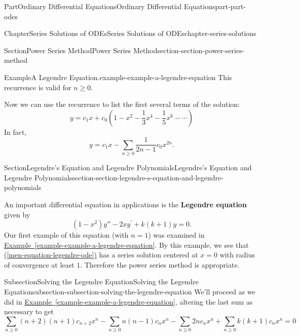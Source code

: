 \documentclass[twoside,10pt,]{book}
\newcommand{\xreffont}{\relax}
\newcommand{\terminology}[1]{\textbf{#1}}
\numberwithin{equation}{part}
\begin{document}
\begin{partptx}{Part}{Ordinary Differential Equations}{}{Ordinary Differential Equations}{}{}{part-part-odes}
\begin{chapterptx}{Chapter}{Series Solutions of ODEs}{}{Series Solutions of ODEs}{}{}{chapter-series-solutions}
\begin{sectionptx}{Section}{Power Series Method}{}{Power Series Method}{}{}{section-section-power-series-method}
\begin{example}{Example}{A Legendre Equation.}{example-example-a-legendre-equation}
This recurrence is valid for \(n\geq0\).%
\par
Now we can use the recurrence to list the first several terms of the solution:%
\begin{equation*}
y = c_{1}x + c_{0}(1 - x^{2} - \frac{1}{3}x^{4} - \frac{1}{5}x^{6} - \cdots)
\end{equation*}
In fact,%
\begin{equation*}
y = c_{1}x - \sum_{n\geq0}\frac{1}{2n - 1}c_{0}x^{2n}\text{.}
\end{equation*}
%
\end{example}
\end{sectionptx}
%
%
\typeout{************************************************}
\typeout{************************************************}
%
\begin{sectionptx}{Section}{Legendre's Equation and Legendre Polynomials}{}{Legendre's Equation and Legendre Polynomials}{}{}{section-section-legendre-s-equation-and-legendre-polynomials}
\begin{introduction}{}%
An important differential equation in applications is the \terminology{Legendre equation} given by%
\begin{equation}
(1 - x^{2})y'' - 2xy^\prime + k(k + 1)y = 0\text{.}\label{men-equation-legendre-ode}
\end{equation}
Our first example of this equation (with \(n = 1\)) was examined in \hyperref[example-example-a-legendre-equation]{Example~{\xreffont\ref{example-example-a-legendre-equation}}}. By this example, we see that \hyperref[men-equation-legendre-ode]{({\xreffont\ref{men-equation-legendre-ode}})} has a series solution centered at \(x = 0\) with radius of convergence at least \(1\). Therefore the power series method is appropriate.%
\end{introduction}%
%
%
\typeout{************************************************}
\typeout{************************************************}
%
\begin{subsectionptx}{Subsection}{Solving the Legendre Equation}{}{Solving the Legendre Equation}{}{}{subsection-subsection-solving-the-legendre-equation}
We'll proceed as we did in \hyperref[example-example-a-legendre-equation]{Example~{\xreffont\ref{example-example-a-legendre-equation}}}, altering the last sum as necessary to get%
\begin{equation*}
\sum_{n\geq0}(n+2)(n+1)c_{n+2}x^{n} - \sum_{n\geq0}n(n-1)c_{n}x^{n} - \sum_{n\geq0}2nc_{n}x^{n} + \sum_{n\geq0}k(k+1)c_{n}x^{n} = 0

\end{equation*}
\end{subsectionptx}
\end{sectionptx}
\end{chapterptx}
\end{partptx}
\end{document}
